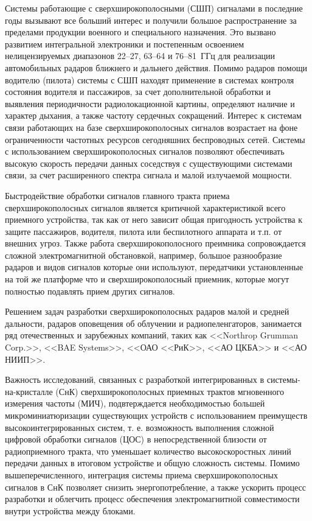 
{\actuality} Системы работающие с сверхширокополосными (СШП) сигналами в последние годы вызывают все больший интерес и получили большое распространение за пределами продукции военного и специального назначения. Это вызвано развитием интегральной электроники и постепенным освоением нелицензируемых диапазонов \numrange[]{22}{27}, \numrange[]{63}{64} и \numrange[]{76}{81}~ГГц для реализации автомобильных радаров ближнего и дальнего действия. Помимо радаров помощи водителю (пилота) системы с СШП находят применение в системах контроля состояния водителя и пассажиров, за счет дополнительной обработки и выявления периодичности радиолокационной картины, определяют наличие и характер дыхания, а также частоту сердечных сокращений. Интерес к системам связи работающих на базе сверхширокополосных сигналов возрастает на фоне ограниченности частотных ресурсов сегодняшних беспроводных сетей. Системы с использованием сверхширокополосных сигналов позволяют обеспечивать высокую скорость передачи данных соседствуя с существующими системами связи, за счет расширенного спектра сигнала и малой излучаемой мощности. 

Быстродействие обработки сигналов главного тракта приема сверхширокополосных сигналов является критичной характеристикой всего приемного устройства, так как от него зависит общая пригодность устройства к защите пассажиров, водителя, пилота или беспилотного аппарата и т.п. от внешних угроз. Также работа сверхширокополосного преимника сопровождается сложной электромагнитной обстановкой, например, большое разнообразие радаров и видов сигналов которые они используют, передатчики установленные на той же платформе что и сверхширокополосный приемник, которые могут полностью подавлять прием других сигналов.

Решением задач разработки сверхширокополосных радаров малой и средней дальности, радаров оповещения об облучении и радиопеленгаторов, занимается ряд отечественных и зарубежных компаний, таких как  <<Northrop Grumman Corp.>>, <<BAE Systems>>, <<ОАО <<РиК>>, <<АО ЦКБА>> и <<АО НИИП>>.

Важность исследований, связанных с разработкой интегрированных в системы-на-кристалле (СнК) сверхширокополосных приемных трактов мгновенного измерения частоты (МИЧ), подвтерждается необходимостью большей микроминиатюризации существующих устройств с использованием преимуществ высокоинтегрированных систем, т. е. возможность выполнения сложной цифровой обработки сигналов (ЦОС) в непосредственной близости от радиоприемного тракта, что уменьшает количество высокоскоростных линий передачи данных в итоговом устройстве и общую сложность системы. Помимо вышеперечисленного, интеграция системы приема сверхширокополосных сигналов в СнК позволяет снизить энергопотребление, а также ускорить процесс разработки и облегчить процесс обеспечения электромагнитной совместимости внутри устройства между блоками.

